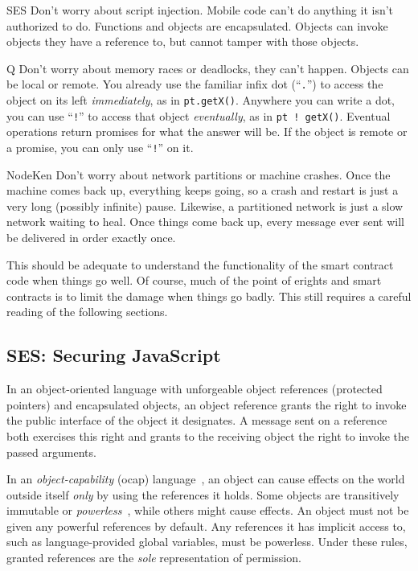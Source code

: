 \documentclass{llncs}
\begin{document}
\begin{description*}
\item[SES] Don't worry about script injection. Mobile code can't do anything it isn't authorized to do. Functions and objects are encapsulated. Objects can invoke objects they have a reference to, but cannot tamper with those objects.

\item[Q] Don't worry about memory races or deadlocks, they can't happen. Objects can be local or remote. You already use the familiar infix dot (``{\tt .}'') to access the object on its left \emph{immediately}, as in {\tt pt.getX()}. Anywhere you can write a dot, you can use ``{\tt !}'' to access that object \emph{eventually}, as in {\tt pt~!~getX()}. Eventual operations return promises for what the answer will be. If the object is remote or a promise, you can only use ``{\tt !}'' on it.

\item[NodeKen] Don't worry about network partitions or machine crashes. Once the machine comes back up, everything keeps going, so a crash and restart is just a very long (possibly infinite) pause. Likewise, a partitioned network is just a slow network waiting to heal. Once things come back up, every message ever sent will be delivered in order exactly once.
\end{description*}

This should be adequate to understand the functionality of the smart contract code when things go well. Of course, much of the point of erights and smart contracts is to limit the damage when things go badly. This still requires a careful reading of the following sections.
 

\subsection{SES: Securing JavaScript}
\label{ses}

In an object-oriented language with unforgeable object references (protected pointers) and encapsulated objects, an object reference grants the right to invoke the public interface of the object it designates. A message sent on a reference both exercises this right and grants to the receiving object the right to invoke the passed arguments. 

In an \emph{object-capability} (ocap) language~\cite{RobustComposition}, an object can cause effects on the world outside itself \emph{only} by using the references it holds. Some objects are transitively immutable or \emph{powerless}~\cite{Mettler:EECS-2012-244}, while others might cause effects. An object must not be given any powerful references by default. Any references it has implicit access to, such as language-provided global variables, must be powerless. Under these rules, granted references are the \emph{sole} representation of permission.
\end{document}
